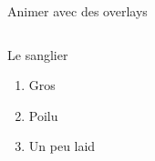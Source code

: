 \documentclass[11pt]{beamer} %
\begin{document}
\begin{frame}{Animer avec des overlays}
  \begin{columns}[c] %
    	
    	\begin{block}{Le sanglier}
    		\begin{enumerate}
    			\item<1-> Gros
    			\item<2-> Poilu
    			\item<3-> Un peu laid
    		\end{enumerate}
    	\end{block}
  \end{columns}
\end{frame}
\end{document}
